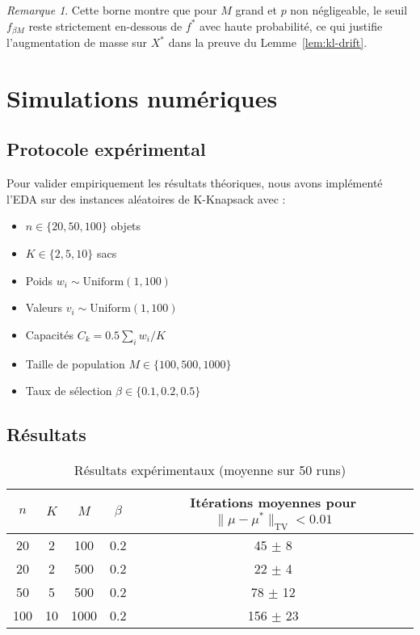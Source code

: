 \documentclass[12pt,a4paper]{article}
\theoremstyle{definition}
\theoremstyle{remark}
\newtheorem{remark}[theorem]{Remarque}
\newcommand{\TV}{\text{TV}}
\begin{document}
\begin{remark}
	Cette borne montre que pour $M$ grand et $p$ non négligeable, 
	le seuil $f_{\beta M}$ reste strictement en-dessous de $f^*$ avec 
	haute probabilité, ce qui justifie l'augmentation de masse sur $X^*$ 
	dans la preuve du Lemme~\ref{lem:kl-drift}.
\end{remark}
\section{Simulations numériques}

\subsection{Protocole expérimental}

Pour valider empiriquement les résultats théoriques, nous avons implémenté l'EDA sur des instances aléatoires de K-Knapsack avec :
\begin{itemize}
\item $n \in \{20, 50, 100\}$ objets
\item $K \in \{2, 5, 10\}$ sacs
\item Poids $w_i \sim \text{Uniform}(1, 100)$
\item Valeurs $v_i \sim \text{Uniform}(1, 100)$
\item Capacités $C_k = 0.5 \sum_i w_i / K$
\item Taille de population $M \in \{100, 500, 1000\}$
\item Taux de sélection $\beta \in \{0.1, 0.2, 0.5\}$
\end{itemize}

\subsection{Résultats}

\begin{table}[h]
\centering
\begin{tabular}{|c|c|c|c|c|}
	\hline
	$n$ & $K$ & $M$ & $\beta$ & Itérations moyennes pour $\|\mu - \mu^*\|_{\TV} < 0.01$ \\
	\hline
	20 & 2 & 100 & 0.2 & 45 $\pm$ 8 \\
	20 & 2 & 500 & 0.2 & 22 $\pm$ 4 \\
	50 & 5 & 500 & 0.2 & 78 $\pm$ 12 \\
	100 & 10 & 1000 & 0.2 & 156 $\pm$ 23 \\
	\hline
\end{tabular}
\caption{Résultats expérimentaux (moyenne sur 50 runs)}
\end{table}
\end{document}
